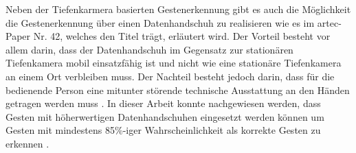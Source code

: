 Neben der Tiefenkarmera basierten Gestenerkennung gibt es auch die Möglichkeit die Gestenerkennung über einen Datenhandschuh zu realisieren wie es im artec-Paper Nr. 42, welches den Titel  trägt, erläutert wird. Der Vorteil besteht vor allem darin, dass der Datenhandschuh im Gegensatz zur stationären Tiefenkamera mobil einsatzfähig ist und nicht wie eine stationäre Tiefenkamera an einem Ort verbleiben muss. Der Nachteil besteht jedoch darin, dass für die bedienende Person eine mitunter störende technische Ausstattung an den Händen getragen werden muss \cite[1\psq]{brauer_gestenerkennung_nodate}. In dieser Arbeit konnte nachgewiesen werden, dass Gesten mit höherwertigen Datenhandschuhen eingesetzt werden können um Gesten mit mindestens 85\%-iger Wahrscheinlichkeit als korrekte Gesten zu erkennen \cite[11\psq]{brauer_gestenerkennung_nodate}.
